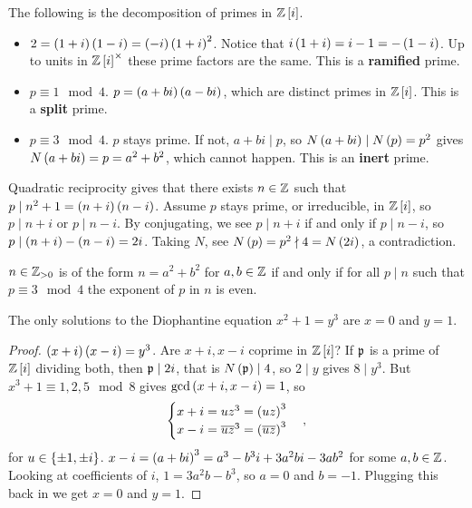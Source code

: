 The following is the decomposition of primes in $ \mathbb{Z}\left[ i \right] $.
\begin{itemize}
\item $ 2 = \left( 1 + i \right)\left( 1 - i \right) = \left( -i \right)\left( 1 + i \right)^2 $. Notice that $ i\left( 1 + i \right) = i - 1 = -\left( 1 - i \right) $. Up to units in $ \mathbb{Z}\left[ i \right]^\times $ these prime factors are the same. This is a \textbf{ramified} prime.
\item $ p \equiv 1 \mod 4 $. $ p = \left( a + bi \right)\left( a - bi \right) $, which are distinct primes in $ \mathbb{Z}\left[ i \right] $. This is a \textbf{split} prime.
\item $ p \equiv 3 \mod 4 $. $ p $ stays prime. If not, $ a + bi \mid p $, so $ N\left( a + bi \right) \mid N\left( p \right) = p^2 $ gives $ N\left( a + bi \right) = p = a^2 + b^2 $, which cannot happen. This is an \textbf{inert} prime.
\end{itemize}


Quadratic reciprocity gives that there exists $ n \in \mathbb{Z} $ such that $ p \mid n^2 + 1 = \left( n + i \right)\left( n - i \right) $. Assume $ p $ stays prime, or irreducible, in $ \mathbb{Z}\left[ i \right] $, so $ p \mid n + i $ or $ p \mid n - i $. By conjugating, we see $ p \mid n + i $ if and only if $ p \mid n - i $, so $ p \mid \left( n + i \right) - \left( n - i \right) = 2i $. Taking $ N $, see $ N\left( p \right) = p^2 \nmid 4 = N\left( 2i \right) $, a contradiction.

\begin{theorem}
$ n \in \mathbb{Z}_{> 0} $ is of the form $ n = a^2 + b^2 $ for $ a, b \in \mathbb{Z} $ if and only if for all $ p \mid n $ such that $ p \equiv 3 \mod 4 $ the exponent of $ p $ in $ n $ is even.
\end{theorem}

\begin{theorem}
The only solutions to the Diophantine equation $ x^2 + 1 = y^3 $ are $ x = 0 $ and $ y = 1 $.
\end{theorem}

\begin{proof}
$ \left( x + i \right)\left( x - i \right) = y^3 $. Are $ x + i, x - i $ coprime in $ \mathbb{Z}\left[ i \right] $? If $ \mathfrak{p} $ is a prime of $ \mathbb{Z}\left[ i \right] $ dividing both, then $ \mathfrak{p} \mid 2i $, that is $ N\left( \mathfrak{p} \right) \mid 4 $, so $ 2 \mid y $ gives $ 8 \mid y^3 $. But $ x^3 + 1 \equiv 1, 2, 5 \mod 8 $ gives $ \gcd\left( x + i, x - i \right) = 1 $, so
$$
\begin{cases}
x + i = uz^3 = \left( uz \right)^3 \\
x - i = \overline{u}\overline{z}^3 = \left( \overline{u}\overline{z} \right)^3
\end{cases},
$$
for $ u \in \left\{ \pm 1, \pm i \right\} $. $ x - i = \left( a + bi \right)^3 = a^3 - b^3i + 3a^2bi - 3ab^2 $ for some $ a, b \in \mathbb{Z} $. Looking at coefficients of $ i $, $ 1 = 3a^2b - b^3 $, so $ a = 0 $ and $ b = -1 $. Plugging this back in we get $ x = 0 $ and $ y = 1 $.
\end{proof}


